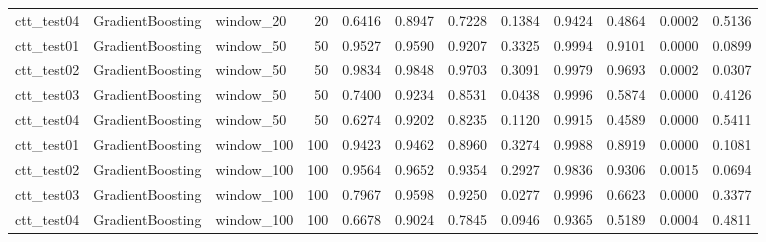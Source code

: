 \begin{tabular}{lllrrrrrrrrr}
ctt\_test04 & GradientBoosting & window\_20 & 20 & 0.6416 & 0.8947 & 0.7228 & 0.1384 & 0.9424 & 0.4864 & 0.0002 & 0.5136 \\
ctt\_test01 & GradientBoosting & window\_50 & 50 & 0.9527 & 0.9590 & 0.9207 & 0.3325 & 0.9994 & 0.9101 & 0.0000 & 0.0899 \\
ctt\_test02 & GradientBoosting & window\_50 & 50 & 0.9834 & 0.9848 & 0.9703 & 0.3091 & 0.9979 & 0.9693 & 0.0002 & 0.0307 \\
ctt\_test03 & GradientBoosting & window\_50 & 50 & 0.7400 & 0.9234 & 0.8531 & 0.0438 & 0.9996 & 0.5874 & 0.0000 & 0.4126 \\
ctt\_test04 & GradientBoosting & window\_50 & 50 & 0.6274 & 0.9202 & 0.8235 & 0.1120 & 0.9915 & 0.4589 & 0.0000 & 0.5411 \\
ctt\_test01 & GradientBoosting & window\_100 & 100 & 0.9423 & 0.9462 & 0.8960 & 0.3274 & 0.9988 & 0.8919 & 0.0000 & 0.1081 \\
ctt\_test02 & GradientBoosting & window\_100 & 100 & 0.9564 & 0.9652 & 0.9354 & 0.2927 & 0.9836 & 0.9306 & 0.0015 & 0.0694 \\
ctt\_test03 & GradientBoosting & window\_100 & 100 & 0.7967 & 0.9598 & 0.9250 & 0.0277 & 0.9996 & 0.6623 & 0.0000 & 0.3377 \\
ctt\_test04 & GradientBoosting & window\_100 & 100 & 0.6678 & 0.9024 & 0.7845 & 0.0946 & 0.9365 & 0.5189 & 0.0004 & 0.4811 \\
\bottomrule
\end{tabular}
